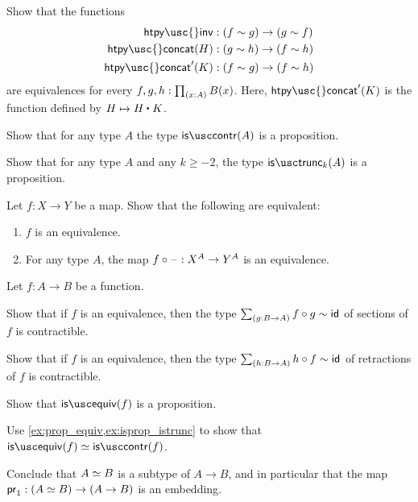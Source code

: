 \begin{exercises}
\item Show that the functions
\begin{align*}
\mathsf{htpy\usc{}inv} & : (f \htpy g) \to (g \htpy f) \\
\mathsf{htpy\usc{}concat}(H) & : (g \htpy h) \to (f \htpy h) \\
\mathsf{htpy\usc{}concat}'(K) & : (f \htpy g) \to (f \htpy h)
\end{align*}
are equivalences for every $f,g,h : \prd{x:A}B(x)$. Here, $\mathsf{htpy\usc{}concat}'(K)$ is the function defined by $H\mapsto \ct{H}{K}$.
\item \label{ex:isprop_istrunc}
\begin{subexenum}
\item Show that for any type $A$ the type $\iscontr(A)$ is a proposition. %
\item Show that for any type $A$ and any $k\geq-2$, the type $\istrunc{k}(A)$ is a proposition.
\end{subexenum}
\item \label{lem:postcomp_equiv}
Let $f:X\to Y$ be a map. Show that the following are equivalent:
\begin{enumerate}
\item $f$ is an equivalence.
\item For any type $A$, the map $f\circ\mathord{\hspace{1pt}\text{--}\hspace{1pt}} : X^A\to Y^A$ is an equivalence.
\end{enumerate}
\item \label{ex:isprop_isequiv}Let $f:A\to B$ be a function.
\begin{subexenum}
\item Show that if $f$ is an equivalence, then the type $\sm{g:B\to A}f\circ g\htpy \idfunc$ of sections of $f$ is contractible.
\item Show that if $f$ is an equivalence, then the type $\sm{h:B\to A}h\circ f\htpy \idfunc$ of retractions of $f$ is contractible.
\item Show that $\isequiv(f)$ is a proposition.
\item Use \cref{ex:prop_equiv,ex:isprop_istrunc} to show that $\isequiv(f)\eqvsym \iscontr(f)$.
\end{subexenum}
Conclude that $\eqv{A}{B}$ is a subtype of $A\to B$, and in particular that the map $\proj 1 : (\eqv{A}{B})\to (A\to B)$ is an embedding.
\item \label{ex:prop_equiv}

\end{exercises}
